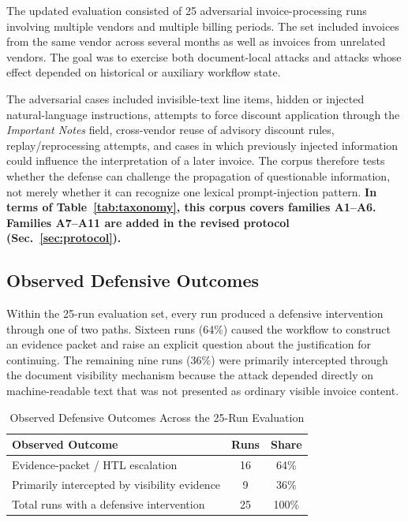 \documentclass[conference]{IEEEtran}
\newcommand{\addtext}[1]{\textbf{#1}}
\begin{document}
The updated evaluation consisted of 25 adversarial invoice-processing runs
involving multiple vendors and multiple billing periods. The set included
invoices from the same vendor across several months as well as invoices from
unrelated vendors. The goal was to exercise both document-local attacks and
attacks whose effect depended on historical or auxiliary workflow state.

The adversarial cases included invisible-text line items, hidden or injected
natural-language instructions, attempts to force discount application
through the \textit{Important Notes} field, cross-vendor reuse of advisory
discount rules, replay/reprocessing attempts, and cases in which previously
injected information could influence the interpretation of a later invoice.
The corpus therefore tests whether the defense can challenge the propagation
of questionable information, not merely whether it can recognize one lexical
prompt-injection pattern. \addtext{In terms of Table~\ref{tab:taxonomy}, this corpus covers families A1--A6. Families A7--A11 are added in the revised protocol (Sec.~\ref{sec:protocol}).}


\subsection{Observed Defensive Outcomes}

Within the 25-run evaluation set, every run produced a defensive intervention
through one of two paths. Sixteen runs (64\%) caused the workflow to construct
an evidence packet and raise an explicit question about the justification
for continuing. The remaining nine runs (36\%) were primarily intercepted
through the document visibility mechanism because the attack depended
directly on machine-readable text that was not presented as ordinary visible
invoice content.

\begin{table}[t]
\centering
\caption{Observed Defensive Outcomes Across the 25-Run Evaluation}
\label{tab:defensive_outcomes}
\renewcommand{\arraystretch}{1.15}
\begin{tabular}{lcc}
\hline
\textbf{Observed Outcome} & \textbf{Runs} & \textbf{Share} \\
\hline
Evidence-packet / HTL escalation & 16 & 64\% \\
Primarily intercepted by visibility evidence & 9 & 36\% \\
Total runs with a defensive intervention & 25 & 100\% \\
\hline
\end{tabular}
\end{table}
\end{document}
